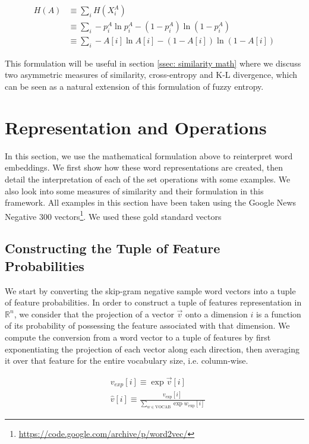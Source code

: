 \documentclass[11pt]{book}
\begin{document}
\begin{align*} H(A) &\equiv \sum_i H(X^A_i) \\ &\equiv \sum_i
-p_i^A \ln p_i^A - (1 - p_i^A) \ln (1 - p_i^A) \\ &\equiv  \sum_i -A[i] \ln
A[i] - (1 - A[i]) \ln (1 - A[i]) \end{align*}

This formulation will be useful in section \ref{ssec: similarity math} where we
discuss two asymmetric measures of similarity, cross-entropy and K-L
divergence, which can be seen as a natural extension of this formulation of
fuzzy entropy.

\section{Representation and Operations} \label{sec: meat of the paper}

In this section, we use the mathematical formulation above to reinterpret word
embeddings. We first show how these word representations are created, then
detail the interpretation of each of the set operations with some examples. We
also look into some measures of similarity and their formulation in this
framework. All examples in this section have been taken using the Google News
Negative 300
vectors\footnote{\url{https://code.google.com/archive/p/word2vec/}}. We used
these gold standard vectors

\subsection{Constructing the Tuple of Feature Probabilities} \label{ssec:
constructing}

We start by converting the skip-gram negative sample word vectors into a tuple
of feature probabilities. In order to construct a tuple of features
representation in $\mathbb{R}^n$, we consider that the projection of a vector
$\vec v$ onto a dimension $i$ is a function of its probability of possessing
the feature associated with that dimension.  We compute the conversion from a
word vector to a tuple of features by first exponentiating the projection of
each vector along each direction, then averaging it over that feature for the
entire vocabulary size, i.e. column-wise.

\begin{align*} & v_{exp}[i] \equiv \exp \vec v[i] \\ & \hat v[i]
\equiv \frac{v_{\text{exp}}[i]}{\sum_{w \in \text{VOCAB}} \exp
w_{\text{exp}}[i]} \end{align*}
\end{document}
